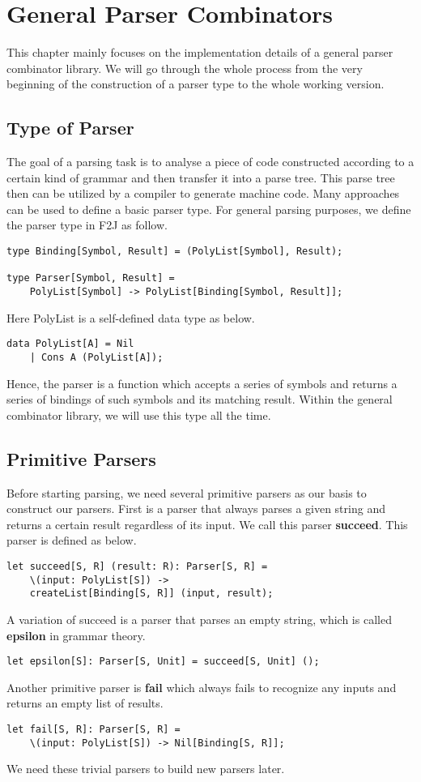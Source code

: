 \chapter{General Parser Combinators}
This chapter mainly focuses on the implementation details of a general parser combinator library. We will go through the whole process from the very beginning of the construction of a parser type to the whole working version.

\section{Type of Parser}
The goal of a parsing task is to analyse a piece of code constructed according to a certain kind of grammar and then transfer it into a parse tree. This parse tree then can be utilized by a compiler to generate machine code. Many approaches can be used to define a basic parser type. For general parsing purposes, we define the parser type in F2J as follow.
\begin{lstlisting}
type Binding[Symbol, Result] = (PolyList[Symbol], Result);

type Parser[Symbol, Result] = 
	PolyList[Symbol] -> PolyList[Binding[Symbol, Result]];
\end{lstlisting}
Here PolyList is a self-defined data type as below.
\begin{lstlisting}
data PolyList[A] = Nil
	| Cons A (PolyList[A]);
\end{lstlisting}
Hence, the parser is a function which accepts a series of symbols and returns a series of bindings of such symbols and its matching result. Within the general combinator library, we will use this type all the time.

\section{Primitive Parsers}
Before starting parsing, we need several primitive parsers as our basis to construct our parsers. First is a parser that always parses a given string and returns a certain result regardless of its input. We call this parser \textbf{succeed}. This parser is defined as below.
\begin{lstlisting}
let succeed[S, R] (result: R): Parser[S, R] =
	\(input: PolyList[S]) -> 
	createList[Binding[S, R]] (input, result);
\end{lstlisting}
A variation of succeed is a parser that parses an empty string, which is called \textbf{epsilon} in grammar theory.
\begin{lstlisting}
let epsilon[S]: Parser[S, Unit] = succeed[S, Unit] ();
\end{lstlisting}
Another primitive parser is \textbf{fail} which always fails to recognize any inputs and returns an empty list of results.
\begin{lstlisting}
let fail[S, R]: Parser[S, R] =
	\(input: PolyList[S]) -> Nil[Binding[S, R]];
\end{lstlisting}
We need these trivial parsers to build new parsers later.


